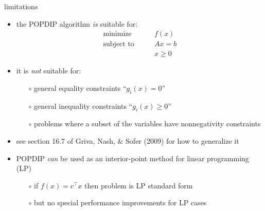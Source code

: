 \documentclass[10pt,hyperref,dvipsnames]{beamer}
\begin{document}
\begin{frame}{limitations}

\begin{itemize}
\item the POPDIP algorithm \emph{is} suitable for:
\begin{equation*}
\begin{matrix}
\text{minimize} \qquad   & f(x) \\
\text{subject to} \qquad & A x = b \\
                         & x \ge 0
\end{matrix}
\end{equation*}
\item it is \emph{not} suitable for:
    \begin{itemize}
    \item[$\circ$] general equality constraints ``$g_i(x)=0$''
    \item[$\circ$] general inequality constraints ``$g_i(x)\ge 0$''
    \item[$\circ$] problems where a subset of the variables have nonnegativity constraints
    \end{itemize}
\item see section 16.7 of Griva, Nash, \& Sofer (2009) for how to generalize it

\medskip
\item POPDIP \emph{can} be used as an interior-point method for linear programming (LP)
    \begin{itemize}
    \item[$\circ$] if $f(x)=c^\top x$ then problem is LP standard form
    \item[$\circ$] but no special performance improvements for LP cases
    \end{itemize}
\end{itemize}
\end{frame}
\end{document}
